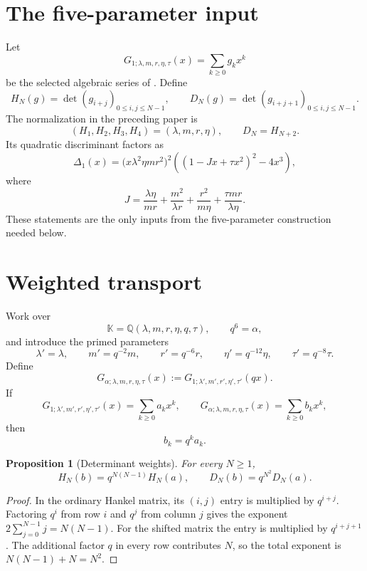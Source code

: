 \documentclass[11pt]{article}
\newtheorem{proposition}[theorem]{Proposition}
\theoremstyle{definition}
\theoremstyle{remark}
\newcommand{\K}{\mathbb{K}}
\newcommand{\Q}{\mathbb{Q}}
\begin{document}
\section{The five-parameter input}
Let
\[
 G_{1;\lambda,m,r,\eta,\tau}(x)=\sum_{k\geq0}g_kx^k
\]
be the selected algebraic series of \cite{Scheuerle2026}.  Define
\[
 H_N(g)=\det(g_{i+j})_{0\leq i,j\leq N-1},\qquad
 D_N(g)=\det(g_{i+j+1})_{0\leq i,j\leq N-1}.
\]
The normalization in the preceding paper is
\begin{equation}
 (H_1,H_2,H_3,H_4)=(\lambda,m,r,\eta),
 \qquad D_N=H_{N+2}.
 \label{eq:old-normalization}
\end{equation}
Its quadratic discriminant factors as
\begin{equation}
 \Delta_1(x)
 =\bigl(x\lambda^2\eta m r^2\bigr)^2
  \left((1-Jx+\tau x^2)^2-4x^3\right),
 \label{eq:old-discriminant}
\end{equation}
where
\begin{equation}
 J=\frac{\lambda\eta}{mr}
   +\frac{m^2}{\lambda r}
   +\frac{r^2}{m\eta}
   +\frac{\tau mr}{\lambda\eta}.
 \label{eq:old-J}
\end{equation}
These statements are the only inputs from the five-parameter construction
needed below.

\section{Weighted transport}
Work over
\[
 \K=\Q(\lambda,m,r,\eta,q,\tau),\qquad q^6=\alpha,
\]
and introduce the primed parameters
\begin{equation}
 \lambda'=\lambda,\qquad m'=q^{-2}m,\qquad
 r'=q^{-6}r,\qquad \eta'=q^{-12}\eta,\qquad
 \tau'=q^{-8}\tau.
 \label{eq:parameter-scaling}
\end{equation}
Define
\begin{equation}
 G_{\alpha;\lambda,m,r,\eta,\tau}(x)
 :=G_{1;\lambda',m',r',\eta',\tau'}(qx).
 \label{eq:transported-G}
\end{equation}
If
\[
 G_{1;\lambda',m',r',\eta',\tau'}(x)=\sum_{k\geq0}a_kx^k,
 \qquad
 G_{\alpha;\lambda,m,r,\eta,\tau}(x)=\sum_{k\geq0}b_kx^k,
\]
then
\begin{equation}
 b_k=q^ka_k.
 \label{eq:coefficient-scaling}
\end{equation}

\begin{proposition}[Determinant weights]
For every $N\geq1$,
\begin{equation}
 H_N(b)=q^{N(N-1)}H_N(a),\qquad
 D_N(b)=q^{N^2}D_N(a).
 \label{eq:determinant-weights}
\end{equation}
\end{proposition}
\begin{proof}
In the ordinary Hankel matrix, its $(i,j)$ entry is multiplied by $q^{i+j}$.
Factoring $q^i$ from row $i$ and $q^j$ from column $j$ gives the exponent
$2\sum_{j=0}^{N-1}j=N(N-1)$.  For the shifted matrix the entry is multiplied
by $q^{i+j+1}$.  The additional factor $q$ in every row contributes $N$, so
the total exponent is $N(N-1)+N=N^2$.
\end{proof}
\end{document}
